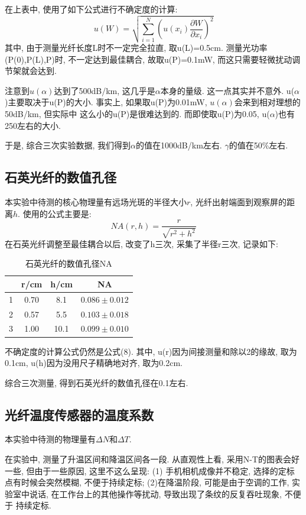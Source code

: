 \documentclass[12pt,a4paper]{article}
\begin{document}
在上表中, 使用了如下公式进行不确定度的计算: 
\begin{equation}
    u(W)=\sqrt{\sum_{i=1}^N (u(x_{i})\frac{\partial W}{\partial x_{i}})^2}
\end{equation}
其中, 由于测量光纤长度L时不一定完全拉直, 取u(L)=0.5cm. 测量光功率(P(0),P(L),P)时, 不一定达到最佳耦合, 故取u(P)=0.1mW, 
而这只需要轻微扰动调节架就会达到. 

注意到$u(\alpha)$达到了500dB/km, 这几乎是$\alpha$本身的量级. 这一点其实并不意外. u($\alpha$)主要取决于u(P)的大小. 事实上, 如果取u(P)为0.01mW, $u(\alpha)$会来到相对理想的50dB/km, 但实际中
这么小的u(P)是很难达到的. 而即使取u(P)为0.05, u($\alpha$)也有250左右的大小.

于是, 综合三次实验数据, 我们得到$\alpha$的值在1000dB/km左右. $\gamma$的值在50\%左右.

\subsection{石英光纤的数值孔径}
本实验中待测的核心物理量有远场光斑的半径大小$r$, 光纤出射端面到观察屏的距离$h$. 
使用的公式主要是:
\begin{equation}
    NA(r,h)=\frac{r}{\sqrt{r^2+h^2}}
\end{equation}
在石英光纤调整至最佳耦合以后, 改变了h三次, 采集了半径r三次, 记录如下:
\begin{table}[H]
    \centering
    \begin{tabular}{|c|c|c|c|} 
    \hline
      & r/cm & h/cm & NA           \\ 
    \hline
    1 & 0.70  & 8.1  & $0.086\pm 0.012$  \\ 
    \hline
    2 & 0.57 & 5.5  & $0.103\pm 0.018$  \\ 
    \hline
    3 & 1.00   & 10.1 & $0.099\pm 0.010$  \\
    \hline
    \end{tabular}
    \caption{石英光纤的数值孔径NA}
    \end{table}
不确定度的计算公式仍然是公式(8). 其中, u(r)因为间接测量和除以2的缘故, 取为0.1cm, u(h)因为没用尺子精确地对齐, 取为0.2cm. 

综合三次测量, 得到石英光纤的数值孔径在0.1左右.

\subsection{光纤温度传感器的温度系数}
本实验中待测的物理量有$\Delta N$和$\Delta T$. 

在实验中, 测量了升温区间和降温区间各一段. 从直观性上看, 采用N-T的图表会好一些, 但由于一些原因, 这里不这么呈现: (1)
手机相机成像并不稳定, 选择的定标点有时候会突然模糊, 不便于持续定标; (2)在降温阶段, 可能是由于空调的工作, 实验室中说话, 在工作台上的其他操作等扰动, 导致出现了条纹的反复吞吐现象, 不便于
持续定标. 
\end{document}
